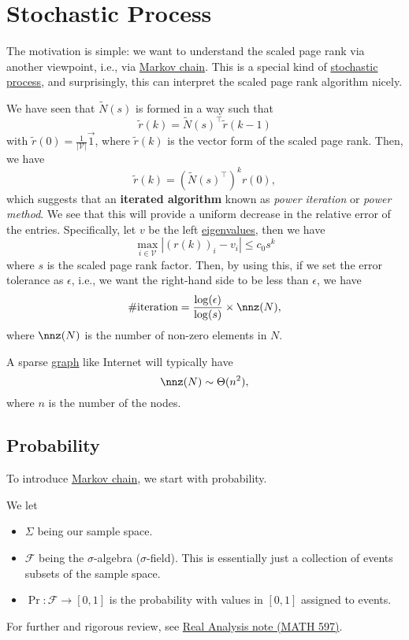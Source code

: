 \chapter{Stochastic Process}
The motivation is simple: we want to understand the scaled page rank via another viewpoint, i.e., via \hyperref[def:Markov-chain]{Markov chain}. This is a special kind of \hyperref[def:stochastic-process]{stochastic process}, and surprisingly, this can interpret the scaled page rank algorithm nicely.

\begin{prev}
	We have seen that \(\widetilde{N}(s)\) is formed in a way such that
	\[
		\widetilde{r}(k) = \widetilde{N}(s)^{\top}\widetilde{r}(k - 1)
	\]
	with \(\widetilde{r}(0) = \frac{1}{\left\vert \mathcal{V} \right\vert }\vec{1}\), where \(\widetilde{r}(k)\) is the vector form of the scaled page rank. Then, we have
	\[
		\widetilde{r}(k) = \left(\widetilde{N}(s)^{\top}\right)^k r(0),
	\]
	which suggests that an \textbf{iterated algorithm} known as \emph{power iteration} or \emph{power method}. We see that this will provide a uniform decrease in the relative error of the entries. Specifically, let \(v\) be the left \hyperref[def:eigenvalue]{eigenvalues}, then we have
	\[
		\max_{i\in \mathcal{V}}\left\vert (r(k))_i - v_i\right\vert \leq c_0 s^k
	\]
	where \(s\) is the scaled page rank factor. Then, by using this, if we set the error tolerance as \(\epsilon\), i.e., we want the right-hand side to be less than \(\epsilon \), we have
	\[
		\#\text{iteration} = \frac{\log(\epsilon)}{\log(s)}\times \nnz(N),
	\]
	where \(\nnz(N)\) is the number of non-zero elements in \(N\).
	\begin{remark}
		A sparse \hyperref[def:graph]{graph} like Internet will typically have
		\[
			\nnz(N)\sim\Theta(n^2),
		\]
		where \(n\) is the number of the nodes.
	\end{remark}
\end{prev}


\section{Probability}
To introduce \hyperref[def:Markov-chain]{Markov chain}, we start with probability.
\begin{prev}
	We let
	\begin{itemize}
		\item \(\Sigma\) being our sample space.
		\item \(\mathcal{F}\) being the \(\sigma\)-algebra (\(\sigma \)-field). This is essentially just a collection of events subsets of the sample space.
		\item \(\Pr \colon \mathcal{F} \to [0, 1]\) is the probability with values in \([0, 1]\) assigned to events.
	\end{itemize}
	For further and rigorous review, see \href{https://www.pbb.wtf/posts/Notes#real-analysis-math597-umich}{Real Analysis note (MATH 597)}.
\end{prev}

